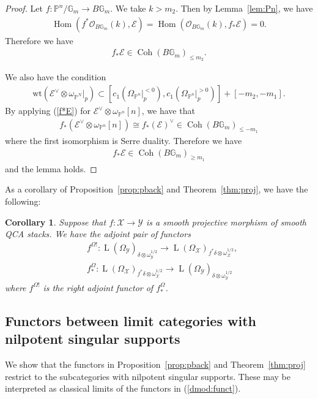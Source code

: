 \documentclass [11pt,oneside,a4paper,mathscr]{amsart}
\newtheorem{cor}[thm]{Corollary}
\theoremstyle{definition}
\renewcommand{\leq}{\leqslant}
\renewcommand{\geq}{\geqslant}
\newcommand{\Y}{\mathcal{Y}}
\newcommand{\LL}{\operatorname{L}}
\newcommand{\X}{\mathcal{X}}
\newcommand{\bgm}{B\mathbb{G}_m}
\newcommand{\Coh}{\operatorname{Coh}}
\newcommand{\Hom}{\operatorname{Hom}}
\newcommand{\wt}{\mathrm{wt}}
\begin{document}
\begin{proof}
    Let $f \colon \mathbb{P}^n/\mathbb{G}_m \to \bgm$. We take $k>m_2$. 
    Then by Lemma~\ref{lem:Pn}, we have
\begin{align*}
    \Hom(f^{\ast}\mathcal{O}_{\bgm}(k), 
    \mathcal{E}) =\Hom(\mathcal{O}_{\bgm}(k), f_{\ast}\mathcal{E})=0. 
\end{align*}
    Therefore we have 
    \begin{align}\label{f*E}
        f_{\ast}\mathcal{E} \in \Coh(\bgm)_{\leq m_2}. 
    \end{align}
    
    We also have the condition 
  \begin{align*}
    \wt(\mathcal{E}^{\vee} \otimes \omega_{\mathbb{P}^N}|_{p}) \subset \left[c_1 (\Omega_{\mathbb{P}^n}|_{p}^{<0}), 
    c_1 (\Omega_{\mathbb{P}^n}|_{p}^{>0})
    \right]+[-m_2, -m_1].
\end{align*}  
By applying (\ref{f*E}) for $\mathcal{E}^{\vee}\otimes \omega_{\mathbb{P}^n}[n]$, we
have that 
\begin{align*}
    f_{\ast}(\mathcal{E}^{\vee}\otimes \omega_{\mathbb{P}^n}[n])
    \cong f_{\ast}(\mathcal{E})^{\vee} \in 
    \Coh(\bgm)_{\leq -m_1}
\end{align*}
where the first isomorphism is Serre duality. 
Therefore we have 
\begin{align*}
    f_{\ast}\mathcal{E} \in \Coh(\bgm)_{\geq m_1}
\end{align*}
and the lemma holds. 
\end{proof}

As a corollary of Proposition~\ref{prop:pback} and Theorem~\ref{thm:proj}, we have 
the following: 
\begin{cor}\label{cor:adjoint}
Suppose that $f \colon \X \to \Y$ is a
smooth projective morphism of smooth QCA stacks. We have 
the adjoint pair of functors 
\begin{align*}
    &f^{\Omega!} \colon \LL(\Omega_{\Y})_{\delta\otimes \omega_{\Y}^{1/2}} \to \LL(\Omega_{\X})_{f^{\ast}\delta \otimes \omega_{\X}^{1/2}}, \\
    &f^{\Omega}_{*} \colon \LL(\Omega_{\X})_{f^{\ast}\delta\otimes \omega_{\X}^{1/2}} \to \LL(\Omega_{\Y})_{\delta \otimes \omega_{\Y}^{1/2}}
\end{align*}
where $f^{\Omega!}$ is the right adjoint functor of 
$f^{\Omega}_{*}$. 
    \end{cor}

\subsection{Functors between limit categories with nilpotent singular supports}
We show that the functors in Proposition~\ref{prop:pback} and Theorem~\ref{thm:proj} restrict to the 
subcategories with nilpotent singular supports. 
These may be interpreted as classical limits of the functors in (\ref{dmod:funct}). 
\end{document}
